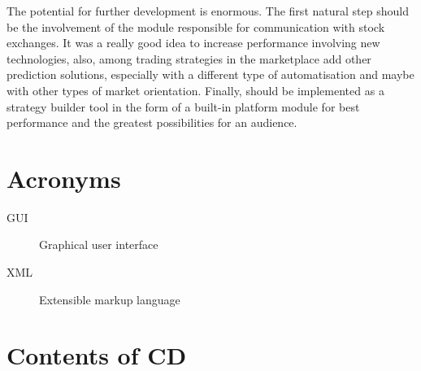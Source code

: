 \documentclass[thesis=B,english]{FITthesis}[2019/03/06]
\begin{document}
The potential for further development is enormous. The first natural step should be the involvement of the module responsible for communication with stock exchanges. It was a really good idea to increase performance involving new technologies, also, among trading strategies in the marketplace add other prediction solutions, especially with a different type of automatisation and maybe with other types of market orientation.
Finally, should be implemented as a strategy builder tool in the form of a built-in platform module for best performance and the greatest possibilities for an audience.




\appendix

\chapter{Acronyms}
\begin{description}
	\item[GUI] Graphical user interface
	\item[XML] Extensible markup language
\end{description}


\chapter{Contents of CD}\label{app:CDcontent}

\begin{figure}
\end{figure}
\end{document}
